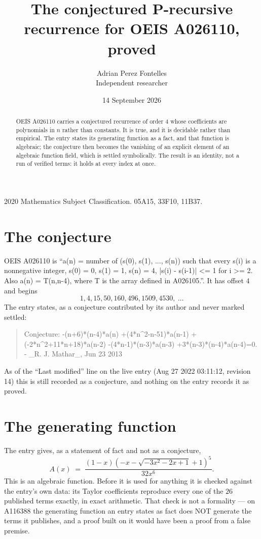 \documentclass[11pt,a4paper]{article}
\title{The conjectured P-recursive recurrence for OEIS A026110, proved}
\author{Adrian Perez Fontelles\\ \small Independent researcher}
\date{14 September 2026}
\theoremstyle{plain}
\theoremstyle{definition}
\begin{document}
\maketitle

\begin{abstract}
OEIS A026110 carries a conjectured recurrence of order $4$ whose coefficients are polynomials in
$n$ rather than constants. It is true, and it is decidable rather than empirical. The entry
states its generating function as a fact, and that function is algebraic; the conjecture then
becomes the vanishing of an explicit element of an algebraic function field, which is settled
symbolically. The result is an identity, not a run of verified terms: it holds at every index
at once.
\end{abstract}

\noindent\small 2020 Mathematics Subject Classification. 05A15, 33F10, 11B37.\normalsize

\section{The conjecture}

OEIS A026110 is ``a(n) = number of (s(0), s(1), ..., s(n)) such that every s(i) is a nonnegative integer, s(0) = 0, s(1) = 1, s(n) = 4, |s(i) - s(i-1)| <= 1 for i >= 2. Also a(n) = T(n,n-4), where T is the array defined in A026105.''. It has offset $4$ and begins
\[
1, 4, 15, 50, 160, 496, 1509, 4530,\ \dots
\]
The entry states, as a conjecture contributed by its author and never marked settled:
\begin{quote}\raggedright\small
Conjecture: -(n+6)*(n-4)*a(n) +(4*n\^{}2-n-51)*a(n-1) +(-2*n\^{}2+11*n+18)*a(n-2) -(4*n-1)*(n-3)*a(n-3) +3*(n-3)*(n-4)*a(n-4)=0. - \_R. J. Mathar\_, Jun 23 2013
\end{quote}
As of the ``Last modified'' line on the live entry (Aug 27 2022 03:11:12, revision 14)
this is still recorded as a conjecture, and nothing on the entry records it as proved.

\section{The generating function}

The entry gives, as a statement of fact and not as a conjecture,
\[
A(x)\;=\;\frac{\left(1 - x\right) \left(- x - \sqrt{- 3 x^{2} - 2 x + 1} + 1\right)^{5}}{32 x^{6}} .
\]
This is an algebraic function. Before it is used for anything it is checked against the entry's
own data: its Taylor coefficients reproduce every one of the $26$ published terms
exactly, in exact arithmetic. That check is not a formality --- on A116388 the generating
function an entry states as fact does NOT generate the terms it publishes, and a proof built on
it would have been a proof from a false premise.
\end{document}
